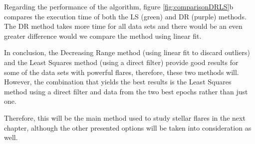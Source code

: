 Regarding the performance of the algorithm, figure \ref{fig:comparisonDRLS}b compares the execution time of both the LS (green) and DR (purple) methods. The DR method takes more time for all data sets and there would be an even greater difference would we compare the method using linear fit.

In conclusion, the Decreasing Range method (using linear fit to discard outliers) and the Least Squares method (using a direct filter) provide good results for some of the data sets with powerful flares, therefore, these two methods will. However, the combination that yields the best results is the Least Squares method using a direct filter and data from the two best epochs rather than just one.

Therefore, this will be the main method used to study stellar flares in the next chapter, although the other presented options will be taken into consideration as well.

